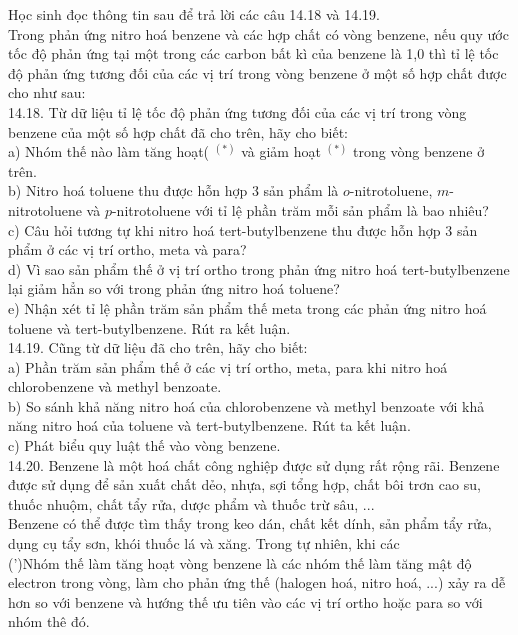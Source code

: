 \documentclass[10pt]{article}
\begin{document}
Học sinh đọc thông tin sau để trả lời các câu 14.18 và 14.19.\\
Trong phản ứng nitro hoá benzene và các hợp chất có vòng benzene, nếu quy ước tốc độ phản ứng tại một trong các carbon bất kì của benzene là 1,0 thì tỉ lệ tốc độ phản ứng tương đối của các vị trí trong vòng benzene ở một số hợp chất được cho như sau:\\
14.18. Từ dữ liệu tỉ lệ tốc độ phản ứng tương đối của các vị trí trong vòng benzene của một số hợp chất đã cho trên, hãy cho biết:\\
a) Nhóm thế nào làm tăng hoạt( ${ }^{(*)}$ và giảm hoạt ${ }^{(*)}$ trong vòng benzene ở trên.\\
b) Nitro hoá toluene thu được hỗn hợp 3 sản phẩm là $o$-nitrotoluene, $m$-nitrotoluene và $p$-nitrotoluene với tỉ lệ phần trăm mỗi sản phẩm là bao nhiêu?\\
c) Câu hỏi tương tự khi nitro hoá tert-butylbenzene thu được hỗn hợp 3 sản phẩm ở các vị trí ortho, meta và para?\\
d) Vì sao sản phẩm thế ở vị trí ortho trong phản ứng nitro hoá tert-butylbenzene\\
lại giảm hẳn so với trong phản ứng nitro hoá toluene?\\
e) Nhận xét tỉ lệ phần trăm sản phẩm thế meta trong các phản ứng nitro hoá toluene và tert-butylbenzene. Rút ra kết luận.\\
14.19. Cũng từ dữ liệu đã cho trên, hãy cho biết:\\
a) Phần trăm sản phẩm thế ở các vị trí ortho, meta, para khi nitro hoá chlorobenzene và methyl benzoate.\\
b) So sánh khả năng nitro hoá của chlorobenzene và methyl benzoate với khả năng nitro hoá của toluene và tert-butylbenzene. Rút ta kết luận.\\
c) Phát biểu quy luật thế vào vòng benzene.\\
14.20. Benzene là một hoá chất công nghiệp được sử dụng rất rộng rãi. Benzene được sử dụng để sản xuất chất dẻo, nhựa, sợi tổng hợp, chất bôi trơn cao su, thuốc nhuộm, chất tẩy rửa, dược phẩm và thuốc trừ sâu, ...\\
Benzene có thể được tìm thấy trong keo dán, chất kết dính, sản phẩm tẩy rửa, dụng cụ tẩy sơn, khói thuốc lá và xăng. Trong tự nhiên, khi các\\
(')Nhóm thế làm tăng hoạt vòng benzene là các nhóm thế làm tăng mật độ electron trong vòng, làm cho phản ứng thế (halogen hoá, nitro hoá, ...) xảy ra dễ hơn so với benzene và hướng thế ưu tiên vào các vị trí ortho hoặc para so với nhóm thê đó.\\
\end{document}
